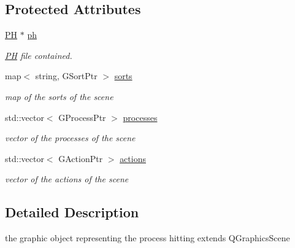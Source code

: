\subsection*{\-Protected \-Attributes}
\begin{DoxyCompactItemize}
\item 
\hypertarget{class_p_h_scene_a332655cec4c6cca3153ffc3ee14eb465}{\hyperlink{class_p_h}{\-P\-H} $\ast$ \hyperlink{class_p_h_scene_a332655cec4c6cca3153ffc3ee14eb465}{ph}}\label{class_p_h_scene_a332655cec4c6cca3153ffc3ee14eb465}

\begin{DoxyCompactList}\small\item\em \hyperlink{class_p_h}{\-P\-H} file contained. \end{DoxyCompactList}\item 
\hypertarget{class_p_h_scene_a664d48bb0ae4f95df04e7a939855cae5}{map$<$ string, \-G\-Sort\-Ptr $>$ \hyperlink{class_p_h_scene_a664d48bb0ae4f95df04e7a939855cae5}{sorts}}\label{class_p_h_scene_a664d48bb0ae4f95df04e7a939855cae5}

\begin{DoxyCompactList}\small\item\em map of the sorts of the scene \end{DoxyCompactList}\item 
\hypertarget{class_p_h_scene_a392d190fc16531af5049727766582bed}{std\-::vector$<$ \-G\-Process\-Ptr $>$ \hyperlink{class_p_h_scene_a392d190fc16531af5049727766582bed}{processes}}\label{class_p_h_scene_a392d190fc16531af5049727766582bed}

\begin{DoxyCompactList}\small\item\em vector of the processes of the scene \end{DoxyCompactList}\item 
\hypertarget{class_p_h_scene_a5802a1a674ffd883d3bf8403399365fb}{std\-::vector$<$ \-G\-Action\-Ptr $>$ \hyperlink{class_p_h_scene_a5802a1a674ffd883d3bf8403399365fb}{actions}}\label{class_p_h_scene_a5802a1a674ffd883d3bf8403399365fb}

\begin{DoxyCompactList}\small\item\em vector of the actions of the scene \end{DoxyCompactList}\end{DoxyCompactItemize}


\subsection{\-Detailed \-Description}
the graphic object representing the process hitting extends \-Q\-Graphics\-Scene 

